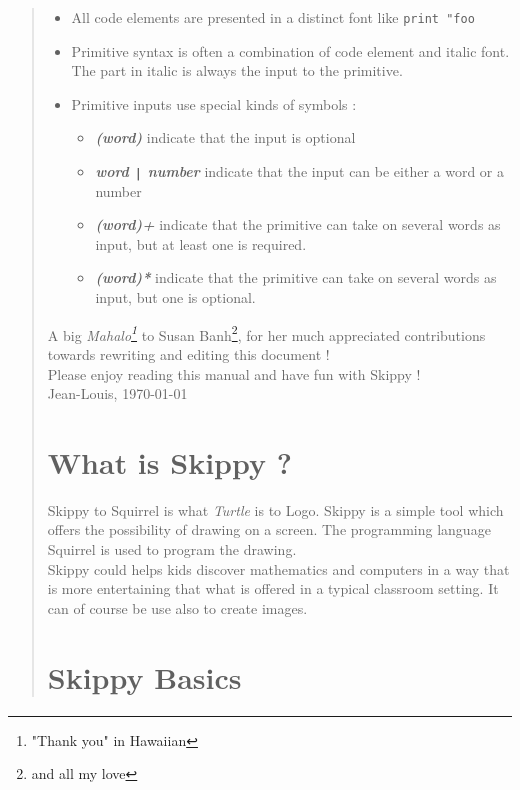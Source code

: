 \documentclass[twoside,10pt,openany]{report}
\newcommand{\squirrel}{{\sc Squirrel} }
\newcommand{\skippy}{{\sc Skippy} }
\newcounter{sc}[chapter]
\begin{document}
\begin{quote}
\begin{itemize}
\item All code elements are presented in a distinct font like {\tt print "foo}
\item Primitive syntax is often a combination of code element and italic font. The part in italic is always the input to the primitive.
\item Primitive inputs use special kinds of symbols :
\begin{itemize}
\item {\it \bf (word)} indicate that the input is optional
\item {\it \bf word \verb?|? number} indicate that the input can be either a word or a number
\item {\it \bf (word)+} indicate that the primitive can take on several words as input, but at least one is required.
\item {\it \bf (word)*} indicate that the primitive can take on several words as input, but one is optional.
\end{itemize}
\end{itemize}

A big {\em Mahalo\footnote{"Thank you" in Hawaiian}} to Susan Banh\footnote{and all my love}, for her much appreciated contributions towards rewriting and editing this document !\\

Please enjoy reading this manual and have fun with \skippy !\\

Jean-Louis, \today


\chapter{What is \skippy ?} 

\skippy to \squirrel is what {\it Turtle} is to Logo.  \skippy is a simple tool which offers the possibility of drawing on a screen. The programming language \squirrel is used to program the drawing.\\

\skippy could helps kids discover mathematics and computers in a way 
that is more entertaining that what is offered in a typical classroom setting. It can of course be use also to create images.

\chapter{\skippy Basics} 


\end{quote}
\end{document}

